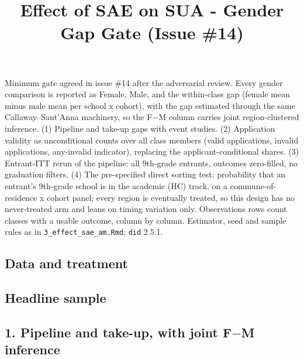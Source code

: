 \documentclass[
]{article}
\title{Effect of SAE on SUA - Gender Gap Gate (Issue \#14)}
\author{}
\date{\vspace{-2.5em}}
\begin{document}
\maketitle

Minimum gate agreed in issue \#14 after the adversarial review. Every
gender comparison is reported as Female, Male, and the within-class gap
(female mean minus male mean per school x cohort), with the gap
estimated through the same Callaway--Sant'Anna machinery, so the F\(-\)M
column carries joint region-clustered inference. (1) Pipeline and
take-up gaps with event studies. (2) Application validity as
unconditional counts over all class members (valid applications, invalid
applications, any-invalid indicator), replacing the
applicant-conditional shares. (3) Entrant-ITT rerun of the pipeline: all
9th-grade entrants, outcomes zero-filled, no graduation filters. (4) The
pre-specified direct sorting test: probability that an entrant's
9th-grade school is in the academic (HC) track, on a
commune-of-residence x cohort panel; every region is eventually treated,
so this design has no never-treated arm and leans on timing variation
only. Observations rows count classes with a usable outcome, column by
column. Estimator, seed and sample rules as in
\texttt{3\_effect\_sae\_am.Rmd}; \texttt{did} 2.5.1.

\hypertarget{data-and-treatment}{%
\subsection{Data and treatment}\label{data-and-treatment}}

\hypertarget{headline-sample}{%
\subsection{Headline sample}\label{headline-sample}}

\hypertarget{pipeline-and-take-up-with-joint-f-m-inference}{%
\subsection{\texorpdfstring{1. Pipeline and take-up, with joint F\(-\)M
inference}{1. Pipeline and take-up, with joint F-M inference}}\label{pipeline-and-take-up-with-joint-f-m-inference}}
\end{document}
